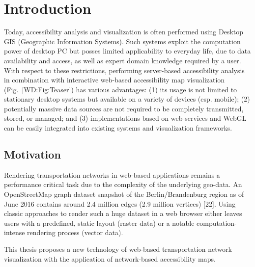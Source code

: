 
\cleardoublepage              %
\chapter{Introduction}
  Today, accessibility analysis and visualization is often performed using Desktop GIS (Geographic Information Systems). Such systems exploit the computation power of desktop PC but posses limited applicability to everyday life, due to data availability and access, as well as expert domain knowledge required by a user. With respect to these restrictions, performing server-based accessibility analysis in combination with interactive web-based accessibility map visualization (Fig.~\ref{WD:Fig:Teaser}) has various advantages: (1) its usage is not limited to stationary desktop systems but available on a variety of devices (esp. mobile); (2) potentially massive data sources are not required to be completely transmitted, stored, or managed; and (3) implementations based on web-services and WebGL \cite{Jackson2016} can be easily integrated into existing systems and visualization frameworks.\par
  \section{Motivation}
    Rendering transportation networks in web-based applications remains a performance critical task due to the complexity of the underlying geo-data. An OpenStreetMap graph dataset snapshot of the Berlin/Brandenburg region as of June 2016 contains around 2.4 million edges (2.9 million vertices) [22]. Using classic approaches to render such a huge dataset in a web browser either leaves users with a predefined, static layout (raster data) or a notable computation-intense rendering process (vector data).\par
    This thesis proposes a new technology of web-based transportation network visualization with the application of network-based accessibility maps.\par
